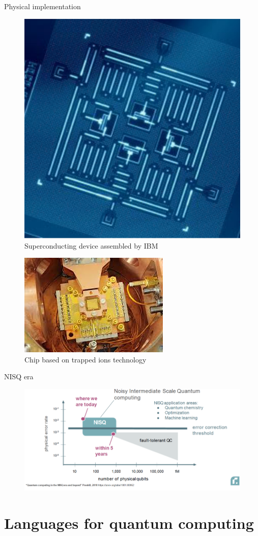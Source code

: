 \documentclass[11p,aspectratio=169]{beamer}
\begin{document}
\begin{frame}{Physical implementation}
\begin{multicols*}{2}
    \begin{figure}
        \includegraphics[width=0.30 \textwidth]{figures/superconducting_qubits.png}
        \caption{Superconducting device assembled by IBM}
        \end{figure}
        \begin{figure}
            \includegraphics[width=0.30 \textwidth]{figures/ion_trap.jpeg}
            \caption{Chip based on trapped ions technology}
            \end{figure}
\end{multicols*}


\end{frame}

\begin{frame}{NISQ era}
    \begin{figure}
        \includegraphics[width=\textwidth]{figures/nisq.png}
    \end{figure}
\end{frame}

\section{Languages for quantum computing}
\end{document}
